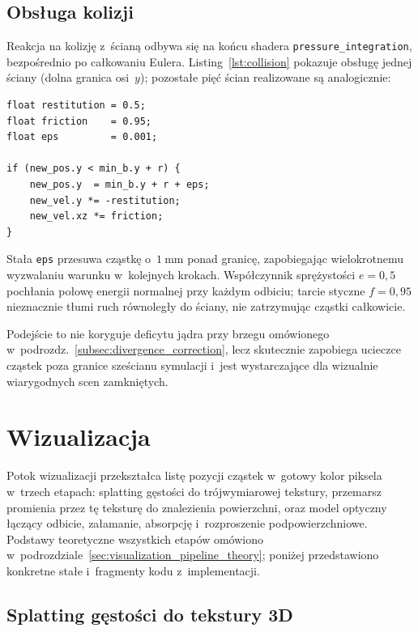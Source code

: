 \subsection{Obsługa kolizji}
\label{subsec:collision}

Reakcja na kolizję z~ścianą odbywa się na końcu shadera
\texttt{pressure\_integration}, bezpośrednio po całkowaniu Eulera.
Listing~\ref{lst:collision} pokazuje obsługę jednej ściany (dolna granica
osi~$y$); pozostałe pięć ścian realizowane są analogicznie:

\begin{lstlisting}[caption={Fragment \texttt{pressure\_integration} --- odbicie od dolnej sciany},
                   label=lst:collision,]
float restitution = 0.5;
float friction    = 0.95;
float eps         = 0.001;

if (new_pos.y < min_b.y + r) {
    new_pos.y  = min_b.y + r + eps;
    new_vel.y *= -restitution;
    new_vel.xz *= friction;
}
\end{lstlisting}

Stała \texttt{eps} przesuwa cząstkę o~$1~\mathrm{mm}$ ponad granicę,
zapobiegając wielokrotnemu wyzwalaniu warunku w~kolejnych krokach.
Współczynnik sprężystości $e = 0{,}5$ pochłania połowę energii normalnej
przy każdym odbiciu; tarcie styczne $f = 0{,}95$ nieznacznie tłumi
ruch równoległy do ściany, nie zatrzymując cząstki całkowicie.

Podejście to nie koryguje deficytu jądra przy brzegu omówionego
w~podrozdz.~\ref{subsec:divergence_correction}, lecz skutecznie
zapobiega ucieczce cząstek poza granice sześcianu symulacji i~jest wystarczające dla
wizualnie wiarygodnych scen zamkniętych.

\section{Wizualizacja}
\label{sec:visualization}

Potok wizualizacji przekształca listę pozycji cząstek w~gotowy kolor piksela
w~trzech etapach: splatting gęstości do trójwymiarowej tekstury, przemarsz promienia
przez tę teksturę do znalezienia powierzchni, oraz model optyczny łączący odbicie,
załamanie, absorpcję i~rozproszenie podpowierzchniowe.
Podstawy teoretyczne wszystkich etapów omówiono w~podrozdziale~\ref{sec:visualization_pipeline_theory};
poniżej przedstawiono konkretne stałe i~fragmenty kodu z~implementacji.

\subsection{Splatting gęstości do tekstury 3D}
\label{subsec:density_splat}

